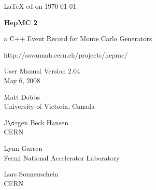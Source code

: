 \documentclass[11pt,letterpaper]{article}
\begin{document}
\newenvironment{fminipage}%
{\begin{Sbox}\begin{minipage}}%
{\end{minipage}\end{Sbox}\fbox{\TheSbox}}
%
%
%
\begin{titlepage}
{\tiny \LaTeX-ed on \today.}

\vspace{2cm}

\begin{center}

{\Huge\bf HepMC 2}

\vspace{1cm}

{\huge a C++ Event Record for Monte Carlo Generators }

\vspace{2cm}

{http://savannah.cern.ch/projects/hepmc/}

\vspace{1cm}

{\Large User Manual Version 2.04} \\
May 6, 2008

\vspace{2cm}

{\huge Matt Dobbs} \\
University of Victoria, Canada

\vspace{.2cm}

{\Large J$\o$rgen Beck Hansen} \\
CERN

\vspace{.2cm}

{\Large Lynn Garren} \\
Fermi National Accelerator Laboratory

\vspace{.2cm}

{\Large Lars Sonnenschein} \\
CERN

\vspace{1cm}


\end{center}
\end{titlepage}
\end{document}
